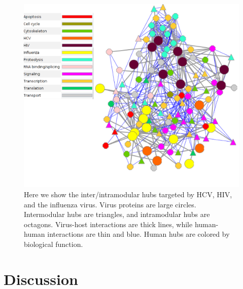 \begin{figure}
\begin{center}
\includegraphics[scale=0.7]{figs/sysBio_3}
\end{center}
\caption[Virus-host hub network]{\small Here we show the
  inter/intramodular hubs targeted by HCV, HIV, and the influenza
  virus. Virus proteins are large circles. Intermodular hubs are
  triangles, and intramodular hubs are octagons. Virus-host
  interactions are thick lines, while human-human interactions are
  thin and blue. Human hubs are colored by biological
  function. \label{fig:sysBio:fig3}}
\end{figure}

\section{Discussion}

